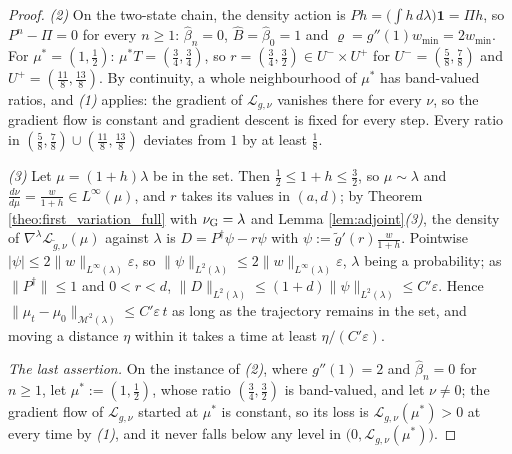 \begin{proof}
\emph{(2)} On the two-state chain, the density action is $Ph=\bigl(\int h\,d\lambda\bigr)\mathbf 1=\Pi h$, so $P^n-\Pi=0$ for every $n\geq1$: $\widehat\beta_n=0$, $\widehat B=\widehat\beta_0=1$ and $\varrho=g''(1)w_{\min}=2w_{\min}$. For $\mu^*=(1,\frac12)$: $\mu^*T=(\frac34,\frac34)$, so $r=(\frac34,\frac32)\in U^-\times U^+$ for $U^-=(\frac58,\frac78)$ and $U^+=(\frac{11}8,\frac{13}8)$. By continuity, a whole neighbourhood of $\mu^*$ has band-valued ratios, and \emph{(1)} applies: the gradient of $\mathcal L_{g,\nu}$ vanishes there for every $\nu$, so the gradient flow is constant and gradient descent is fixed for every step. Every ratio in $(\frac58,\frac78)\cup(\frac{11}8,\frac{13}8)$ deviates from $1$ by at least $\frac18$.

\emph{(3)} Let $\mu=(1+h)\lambda$ be in the set. Then $\frac12\leq1+h\leq\frac32$, so $\mu\sim\lambda$ and $\frac{d\nu}{d\mu}=\frac w{1+h}\in L^\infty(\mu)$, and $r$ takes its values in $(a,d)$; by Theorem \ref{theo:first_variation_full} with $\nu_{\mathrm{G}}=\lambda$ and Lemma \ref{lem:adjoint}\emph{(3)}, the density of $\nabla^\lambda\mathcal L_{\tilde g,\nu}(\mu)$ against $\lambda$ is $D=P^\dagger\psi-r\psi$ with $\psi:=\tilde g'(r)\frac w{1+h}$. Pointwise $|\psi|\leq2\|w\|_{L^\infty(\lambda)}\varepsilon$, so $\|\psi\|_{L^2(\lambda)}\leq2\|w\|_{L^\infty(\lambda)}\varepsilon$, $\lambda$ being a probability; as $\|P^\dagger\|\leq1$ and $0<r<d$, $\|D\|_{L^2(\lambda)}\leq(1+d)\|\psi\|_{L^2(\lambda)}\leq C'\varepsilon$. Hence $\|\mu_t-\mu_0\|_{\mathcal M^2(\lambda)}\leq C'\varepsilon\,t$ as long as the trajectory remains in the set, and moving a distance $\eta$ within it takes a time at least $\eta/(C'\varepsilon)$.

\emph{The last assertion.} On the instance of \emph{(2)}, where $g''(1)=2$ and $\widehat\beta_n=0$ for $n\geq1$, let $\mu^*:=(1,\frac12)$, whose ratio $(\frac34,\frac32)$ is band-valued, and let $\nu\neq0$; the gradient flow of $\mathcal L_{g,\nu}$ started at $\mu^*$ is constant, so its loss is $\mathcal L_{g,\nu}(\mu^*)>0$ at every time by \emph{(1)}, and it never falls below any level in $\bigl(0,\mathcal L_{g,\nu}(\mu^*)\bigr)$.
\end{proof}

